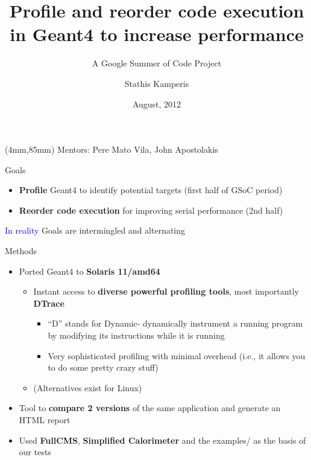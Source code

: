 \documentclass{beamer}
\newenvironment{reference}[2]{%
  \begin{textblock*}{\textwidth}(#1,#2) 
      \tiny\bgroup\color{red!50!black}}{\egroup\end{textblock*}}
\begin{document}
\title{Profile and reorder code execution in Geant4 to increase performance}
\subtitle{A Google Summer of Code Project}
\author{Stathis Kamperis}
\date{August, 2012}


\begin{frame}[plain]
  \titlepage
\begin{reference}{4mm}{85mm}
Mentors: Pere Mato Vila, John Apostolakis
\end{reference}
\end{frame}


\begin{frame}{Goals}
\begin{itemize}
\item {\bf Profile} Geant4 to identify potential targets (first half of GSoC period)
\item {\bf Reorder code execution} for improving serial performance (2nd half)
\end{itemize}
\textcolor{blue}{In reality } Goals are intermingled and alternating
\end{frame}

\begin{frame}{Methods}
\begin{itemize}
\item Ported Geant4 to {\bf Solaris 11/amd64}
\begin{itemize}
\item Instant access to {\bf diverse powerful profiling tools}, most importantly {\bf DTrace}
\begin{itemize}
\item ``D'' stands for Dynamic- dynamically instrument a running program by modifying its instructions while it is running
\item Very sophisticated profiling with minimal overhead (i.e., it allows you to do some pretty crazy stuff)
\end{itemize}
\item (Alternatives exist for Linux)
\end{itemize}
\item Tool to {\bf compare 2 versions} of the same application and generate an HTML report
\item Used {\bf FullCMS}, {\bf Simplified Calorimeter} and the examples/ as the basis of our tests
\end{itemize}
\end{frame}
\end{document}
